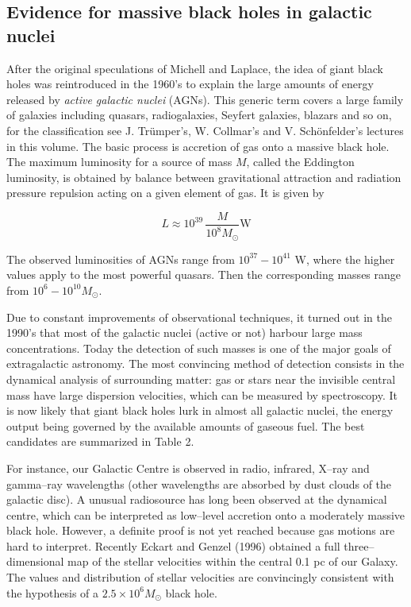 \documentclass[12pt]{article}
\begin{document}
 
\subsection {Evidence for massive black holes in galactic nuclei}

After the original speculations of Michell and Laplace, the idea of 
giant black holes was reintroduced in the 1960's to explain the 
large amounts of energy released by {\it active galactic nuclei} (AGNs). This 
generic term covers a large family of galaxies including quasars, 
radiogalaxies, Seyfert galaxies, blazars and so on, for the 
classification  see J. Tr\"umper's, W. Collmar's and V. Sch\"onfelder's
lectures in this volume.
The basic process is accretion of gas onto a massive 
black hole. The maximum luminosity for a source of mass $M$, called 
the Eddington luminosity, is obtained by balance between 
gravitational attraction and radiation pressure repulsion acting on a 
given element of gas. It is given by 

\begin{equation}
L \approx 10^{39} \, \frac{M}{10^{8}M_{\odot}} \textrm{W}
        \label{luminet:16}
\end{equation}

The observed luminosities of AGNs range from $10^{37} -10^{41}$ 
W, where the higher values apply to the most powerful 
quasars.  Then the corresponding masses range from $10^{6} - 
10^{10} M_{\odot}$. 

Due to constant improvements of 
observational techniques, it turned out in the 1990's that most of the galactic 
nuclei (active or not)  harbour large mass concentrations. Today the 
detection of such masses is one of the major goals of  
extragalactic astronomy. The most convincing method of detection consists in 
the dynamical analysis of surrounding matter: gas or stars near 
the invisible central mass have large dispersion velocities, which can 
be measured by spectroscopy. It is now likely that giant black holes 
lurk in almost all galactic nuclei, the energy output 
being governed by the available amounts of gaseous fuel. The best 
candidates are summarized in Table 2. 

For instance, our Galactic Centre is observed in radio, infrared, X--ray and gamma--ray 
wavelengths (other wavelengths are absorbed by dust clouds of 
the galactic disc). A unusual radiosource has long been observed at 
the dynamical centre, which can be interpreted as low--level accretion 
onto a moderately massive black hole. However, a definite proof is not yet 
reached because gas motions are hard to interpret. Recently Eckart 
and Genzel (1996) obtained a full three--dimensional map of the 
stellar velocities within the central 0.1 pc of our Galaxy. The 
values and distribution of stellar velocities are convincingly 
consistent with the  hypothesis of a $2.5 \times 10^{6} M_{\odot}$ black 
hole.
\end{document}
